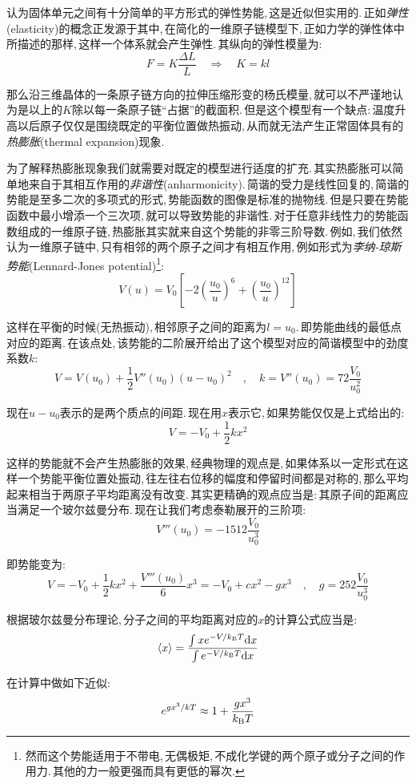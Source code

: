 认为固体单元之间有十分简单的平方形式的弹性势能,\,这是近似但实用的.\,正如\emph{弹性}(elasticity)的概念正发源于其中,\,在简化的一维原子链模型下,\,正如力学的弹性体中所描述的那样,\,这样一个体系就会产生弹性.\,其纵向的弹性模量为:
\[F=K\frac{\Delta L}{L}\quad \Rightarrow \quad K=kl\]

那么沿三维晶体的一条原子链方向的拉伸压缩形变的杨氏模量,\,就可以不严谨地认为是以上的$K$除以每一条原子链``占据''的截面积.\,但是这个模型有一个缺点:\,温度升高以后原子仅仅是围绕既定的平衡位置做热振动,\,从而就无法产生正常固体具有的\emph{热膨胀}(thermal expansion)现象.

为了解释热膨胀现象我们就需要对既定的模型进行适度的扩充.\,其实热膨胀可以简单地来自于其相互作用的\emph{非谐性}(anharmonicity).\,简谐的受力是线性回复的,\,简谐的势能是至多二次的多项式的形式,\,势能函数的图像是标准的抛物线.\,但是只要在势能函数中最小增添一个三次项,\,就可以导致势能的非谐性.\,对于任意非线性力的势能函数组成的一维原子链,\,热膨胀其实就来自这个势能的非零三阶导数.\,例如,\,我们依然认为一维原子链中,\,只有相邻的两个原子之间才有相互作用,\,例如形式为\emph{李纳-琼斯势能}(Lennard-Jones potential)\footnote{然而这个势能适用于不带电,\,无偶极矩,\,不成化学键的两个原子或分子之间的作用力.\,其他的力一般更强而具有更低的幂次.}:
\[V(u)=V_0  \left[ -2\left( \frac{u_0}{u} \right)^6+ \left( \frac{u_0}{u} \right)^{12}\right]  \]

这样在平衡的时候(无热振动),\,相邻原子之间的距离为$l=u_0$.\,即势能曲线的最低点对应的距离.\,在该点处,\,该势能的二阶展开给出了这个模型对应的简谐模型中的劲度系数$k$:
\[V=V(u_0)+\frac{1}{2}V''(u_0)(u-u_0)^2 \quad,\quad k=V''(u_0)=72\frac{V_0}{u_0^2}\]

现在$u-u_0$表示的是两个质点的间距.\,现在用$x$表示它,\,如果势能仅仅是上式给出的:
\[V=-V_0+\frac{1}{2}kx^2\]

这样的势能就不会产生热膨胀的效果,\,经典物理的观点是,\,如果体系以一定形式在这样一个势能平衡位置处振动,\,往左往右位移的幅度和停留时间都是对称的,\,那么平均起来相当于两原子平均距离没有改变.\,其实更精确的观点应当是:\,其原子间的距离应当满足一个玻尔兹曼分布.\,现在让我们考虑泰勒展开的三阶项:
\[V'''(u_0)=-1512\frac{V_0}{u_0^3}\]

即势能变为:
\[V=-V_0+\frac{1}{2}kx^2+\frac{V'''(u_0)}{6}x^3=-V_0+cx^2-gx^3 \quad,\quad g=252\frac{V_0}{u_0^3}\]

根据玻尔兹曼分布理论,\,分子之间的平均距离对应的$x$的计算公式应当是:
\[\langle x\rangle=\frac{\int xe^{-V/k_{\rm B}T}\textrm{d} x}{\int e^{-V/k_{\rm B}T}\textrm{d} x}\]

在计算中做如下近似:
\[e^{gx^3/kT}\approx1+\frac{gx^3}{k_{\rm B}T}\]

